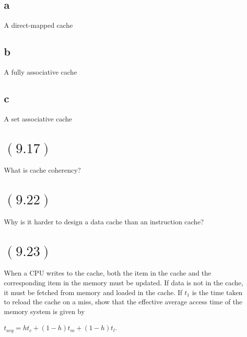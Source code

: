 \documentclass[letterpaper,12pt,titlepage]{article}
\begin{document}
\subsection*{a} A direct-mapped cache
\begin{mdframed}[style=MyFrame]
\end{mdframed}
\subsection*{b} A fully associative cache
\begin{mdframed}[style=MyFrame]
\end{mdframed}
\subsection*{c} A set associative cache
\begin{mdframed}[style=MyFrame]
\end{mdframed}

\section*{$(9.17)$} What is cache coherency?

\begin{mdframed}[style=MyFrame]
\end{mdframed}

\section*{$(9.22)$} Why is it harder to design a data cache than an instruction cache?

\begin{mdframed}[style=MyFrame]
\end{mdframed}

\section*{$(9.23)$} When a CPU writes to the cache, both the item in the cache and the corresponding item in the memory must be updated. If data is not in the cache, it must be fetched from memory and loaded in the cache. If $t_1$ is the time taken to reload the cache on a miss, show that the effective average access time of the memory system is given by

$t_{avg} = ht_{c} + (1 - h)t_{m} + (1 - h)t_{l}$.

\begin{mdframed}[style=MyFrame]
\end{mdframed}
\end{document}
